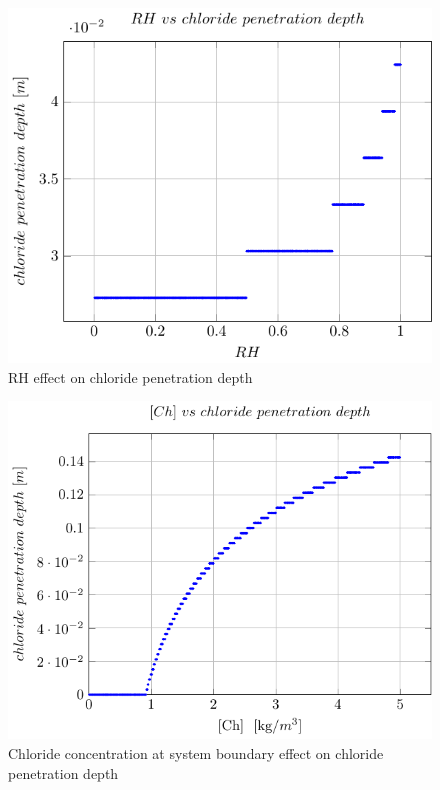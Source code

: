 \begin{figure}[H]
    \centering
    \includegraphics[width=\linewidth]{imgs/pdfs/11_RH_corr.pdf}
    \caption{RH effect on chloride penetration depth}\label{RH vs chloride depth}
\end{figure}
\begin{figure}[H]
    \centering
    \includegraphics[width=\linewidth]{imgs/pdfs/11_Chloride_corr.pdf}
    \caption{Chloride concentration at system boundary effect on chloride penetration depth}\label{Chloride vs corrosion depth}
\end{figure}

